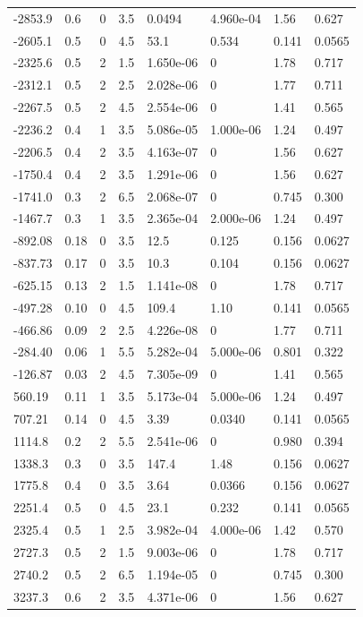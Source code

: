 \documentclass[preview]{standalone}
\begin{document}
{{\begin{tabular}{L{1.2cm}C{1.2cm} C{0.3cm}C{0.5cm} C{1.4cm}C{1.4cm} C{1.4cm}C{1.4cm}}
  -2853.9  &   0.6  & 0     & 3.5 &  0.0494  & 4.960e-04  & 1.56 &  0.627   \\ 
  -2605.1  &   0.5  & 0     & 4.5 &  53.1  & 0.534  & 0.141 &  0.0565   \\ 
  -2325.6  &   0.5  & 2     & 1.5 &  1.650e-06  & 0  & 1.78 &  0.717   \\ 
  -2312.1  &   0.5  & 2     & 2.5 &  2.028e-06  & 0  & 1.77 &  0.711   \\ 
  -2267.5  &   0.5  & 2     & 4.5 &  2.554e-06  & 0  & 1.41 &  0.565   \\ 
  -2236.2  &   0.4  & 1     & 3.5 &  5.086e-05  & 1.000e-06  & 1.24 &  0.497   \\ 
  -2206.5  &   0.4  & 2     & 3.5 &  4.163e-07  & 0  & 1.56 &  0.627   \\ 
  -1750.4  &   0.4  & 2     & 3.5 &  1.291e-06  & 0  & 1.56 &  0.627   \\ 
  -1741.0  &   0.3  & 2     & 6.5 &  2.068e-07  & 0  & 0.745 &  0.300   \\ 
  -1467.7  &   0.3  & 1     & 3.5 &  2.365e-04  & 2.000e-06  & 1.24 &  0.497   \\ 
  -892.08  &  0.18  & 0     & 3.5 &  12.5  & 0.125  & 0.156 &  0.0627   \\ 
  -837.73  &  0.17  & 0     & 3.5 &  10.3  & 0.104  & 0.156 &  0.0627   \\ 
  -625.15  &  0.13  & 2     & 1.5 &  1.141e-08  & 0  & 1.78 &  0.717   \\ 
  -497.28  &  0.10  & 0     & 4.5 &  109.4  & 1.10  & 0.141 &  0.0565   \\ 
  -466.86  &  0.09  & 2     & 2.5 &  4.226e-08  & 0  & 1.77 &  0.711   \\ 
  -284.40  &  0.06  & 1     & 5.5 &  5.282e-04  & 5.000e-06  & 0.801 &  0.322   \\ 
  -126.87  &  0.03  & 2     & 4.5 &  7.305e-09  & 0  & 1.41 &  0.565   \\ 
  560.19  &  0.11  & 1     & 3.5 &  5.173e-04  & 5.000e-06  & 1.24 &  0.497   \\ 
  707.21  &  0.14  & 0     & 4.5 &  3.39  & 0.0340  & 0.141 &  0.0565   \\ 
  1114.8  &   0.2  & 2     & 5.5 &  2.541e-06  & 0  & 0.980 &  0.394   \\ 
  1338.3  &   0.3  & 0     & 3.5 &  147.4  & 1.48  & 0.156 &  0.0627   \\ 
  1775.8  &   0.4  & 0     & 3.5 &  3.64  & 0.0366  & 0.156 &  0.0627   \\ 
  2251.4  &   0.5  & 0     & 4.5 &  23.1  & 0.232  & 0.141 &  0.0565   \\ 
  2325.4  &   0.5  & 1     & 2.5 &  3.982e-04  & 4.000e-06  & 1.42 &  0.570   \\ 
  2727.3  &   0.5  & 2     & 1.5 &  9.003e-06  & 0  & 1.78 &  0.717   \\ 
  2740.2  &   0.5  & 2     & 6.5 &  1.194e-05  & 0  & 0.745 &  0.300   \\ 
  3237.3  &   0.6  & 2     & 3.5 &  4.371e-06  & 0  & 1.56 &  0.627   \\ 
\hline 
\end{tabular} 

}}
\end{document}

